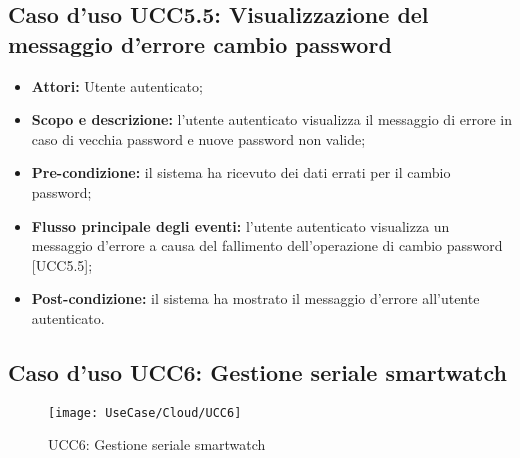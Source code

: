 \subsection{Caso d'uso UCC5.5: Visualizzazione del messaggio d'errore cambio password}

\begin{itemize}
\item \textbf{Attori:} Utente autenticato;
\item \textbf{Scopo e descrizione:} l'utente autenticato visualizza il messaggio di errore in caso di vecchia password e nuove password non valide;
\item \textbf{Pre-condizione:} il sistema ha ricevuto dei dati errati per il cambio password;
\item \textbf{Flusso principale degli eventi:} l'utente autenticato visualizza un messaggio d'errore a causa del fallimento dell'operazione di cambio password [UCC5.5];
\item \textbf{Post-condizione:} il sistema ha mostrato il messaggio d'errore all'utente autenticato.
\end{itemize}



\subsection{Caso d'uso UCC6: Gestione seriale smartwatch}

\begin{figure}[H]
\centering
\texttt{[image: UseCase/Cloud/UCC6]}
\caption{UCC6: Gestione seriale smartwatch}
\end{figure}

